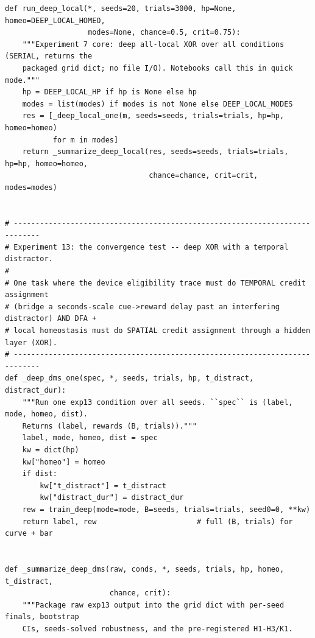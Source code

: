 \begin{lstlisting}[caption={mrl\_trace/deep.py},label={lst:siox-src-deep}]
def run_deep_local(*, seeds=20, trials=3000, hp=None, homeo=DEEP_LOCAL_HOMEO,
                   modes=None, chance=0.5, crit=0.75):
    """Experiment 7 core: deep all-local XOR over all conditions (SERIAL, returns the
    packaged grid dict; no file I/O). Notebooks call this in quick mode."""
    hp = DEEP_LOCAL_HP if hp is None else hp
    modes = list(modes) if modes is not None else DEEP_LOCAL_MODES
    res = [_deep_local_one(m, seeds=seeds, trials=trials, hp=hp, homeo=homeo)
           for m in modes]
    return _summarize_deep_local(res, seeds=seeds, trials=trials, hp=hp, homeo=homeo,
                                 chance=chance, crit=crit, modes=modes)


# ----------------------------------------------------------------------------
# Experiment 13: the convergence test -- deep XOR with a temporal distractor.
#
# One task where the device eligibility trace must do TEMPORAL credit assignment
# (bridge a seconds-scale cue->reward delay past an interfering distractor) AND DFA +
# local homeostasis must do SPATIAL credit assignment through a hidden layer (XOR).
# ----------------------------------------------------------------------------
def _deep_dms_one(spec, *, seeds, trials, hp, t_distract, distract_dur):
    """Run one exp13 condition over all seeds. ``spec`` is (label, mode, homeo, dist).
    Returns (label, rewards (B, trials))."""
    label, mode, homeo, dist = spec
    kw = dict(hp)
    kw["homeo"] = homeo
    if dist:
        kw["t_distract"] = t_distract
        kw["distract_dur"] = distract_dur
    rew = train_deep(mode=mode, B=seeds, trials=trials, seed0=0, **kw)
    return label, rew                       # full (B, trials) for curve + bar


def _summarize_deep_dms(raw, conds, *, seeds, trials, hp, homeo, t_distract,
                        chance, crit):
    """Package raw exp13 output into the grid dict with per-seed finals, bootstrap
    CIs, seeds-solved robustness, and the pre-registered H1-H3/K1.


\end{lstlisting}
